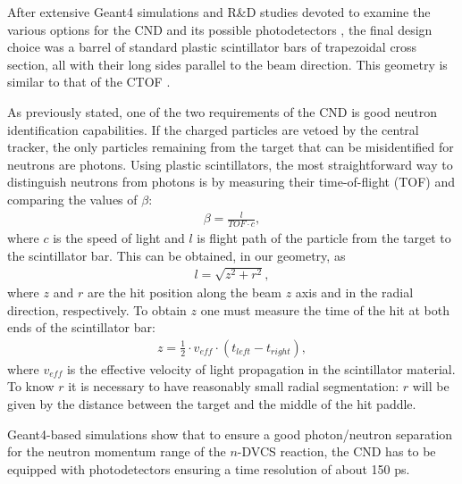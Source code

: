 After extensive Geant4 simulations and R\&D studies devoted to examine the various options for the CND and its possible photodetectors \cite{Niccolai:2018qzm}, the final design choice was a barrel of standard plastic scintillator bars of trapezoidal cross section, all with their long sides parallel to the beam direction. This geometry is similar to that of the CTOF \cite{ctof-nim}. 

As previously stated, one of the two requirements of the CND is good neutron identification capabilities. If the charged particles are vetoed by the central tracker, the only particles remaining from the target that can be misidentified for neutrons are photons. Using plastic scintillators, the most straightforward way to distinguish neutrons from photons is by measuring their time-of-flight (TOF) and comparing the values of $\beta$:
\begin{eqnarray}
\beta= \frac{l}{TOF\cdot c},
\end{eqnarray}
where $c$ is the speed of light and $l$ is flight path of the particle from the target to the scintillator bar. This can be obtained, in our geometry, as
\begin{eqnarray}
l= \sqrt{z^2+r^2},
\end{eqnarray}
where $z$ and $r$ are the hit position along the beam $z$ axis and in the radial direction, respectively. To obtain $z$ one must measure the time of the hit at both ends of the scintillator bar:
\begin{eqnarray}
z=\frac{1}{2} \cdot v_{eff}\cdot(t_{left}-t_{right}),
\end{eqnarray}
where $v_{eff}$ is the effective velocity of light propagation in the scintillator material. To know $r$ it is necessary to have reasonably small radial segmentation: $r$ will be given by the distance between the target and the middle of the hit paddle.
   
Geant4-based simulations show that to ensure a good photon/neutron separation for the neutron momentum range of the $n$-DVCS reaction, the CND has to be equipped with photodetectors ensuring a time resolution of about 150 ps. 


